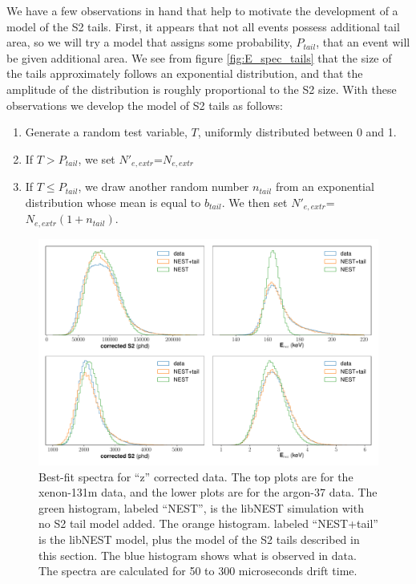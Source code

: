 We have a few observations in hand that help to motivate the development of a model of the S2 tails. First, it appears that not all events possess additional tail area, so we will try a model that assigns some probability, $P_{tail}$, that an event will be given additional area. We see from figure \ref{fig:E_spec_tails} that the size of the tails approximately follows an exponential distribution, and that the amplitude of the distribution is roughly proportional to the S2 size. With these observations we develop the model of S2 tails as follows:
\begin{enumerate}
\item Generate a random test variable, $T$, uniformly distributed between 0 and 1.
\item If $T>P_{tail}$, we set $N'_{e,extr}$=$N_{e,extr}$
\item If $T\leq P_{tail}$, we draw another random number $n_{tail}$ from an exponential distribution whose mean is equal to $b_{tail}$. We then set $N'_{e,extr}$=$N_{e,extr}(1+n_{tail})$.
\end{enumerate}
\begin{figure}[h!]
  \centering
  \includegraphics[width=\textwidth]{Figures/S2tail_hists_z.pdf}
\caption{Best-fit spectra for ``z'' corrected data. The top plots are for the xenon-131m data, and the lower plots are for the argon-37 data. The green histogram, labeled ``NEST'', is the libNEST simulation with no S2 tail model added. The orange histogram. labeled ``NEST+tail'' is the libNEST model, plus the model of the S2 tails described in this section. The blue histogram shows what is observed in data. The spectra are calculated for 50 to 300 microseconds drift time.  }
\label{fig:s2bestfit_spec_z}
\end{figure}

